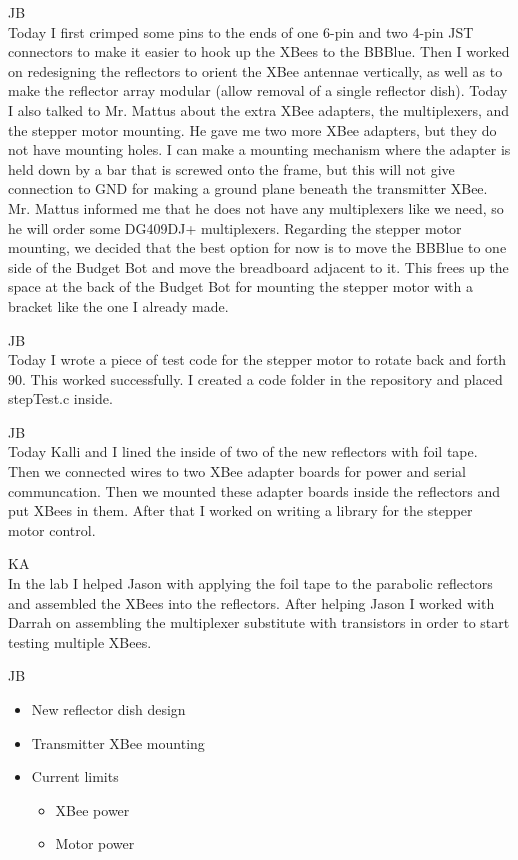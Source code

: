 \documentclass[fontsize=11pt, %
                             paper=letter, %
                             openany, %
                             captions=tableheading,
                             index=totoc,
                             hyperref]{labbook}
\begin{document}
\begin{addmargin}[0cm]{0cm}
JB\\
Today I first crimped some pins to the ends of one 6-pin and two 4-pin JST connectors to make it easier to hook up the XBees to the BBBlue. Then I worked on redesigning the reflectors to orient the XBee antennae vertically, as well as to make the reflector array modular (allow removal of a single reflector dish). Today I also talked to Mr. Mattus about the extra XBee adapters, the multiplexers, and the stepper motor mounting. He gave me two more XBee adapters, but they do not have mounting holes. I can make a mounting mechanism where the adapter is held down by a bar that is screwed onto the frame, but this will not give connection to GND for making a ground plane beneath the transmitter XBee. Mr. Mattus informed me that he does not have any multiplexers like we need, so he will order some DG409DJ+ multiplexers. Regarding the stepper motor mounting, we decided that the best option for now is to move the BBBlue to one side of the Budget Bot and move the breadboard adjacent to it. This frees up the space at the back of the Budget Bot for mounting the stepper motor with a bracket like the one I already made.



JB\\
Today I wrote a piece of test code for the stepper motor to rotate back and forth 90\textdegree. This worked successfully. I created a code folder in the repository and placed stepTest.c inside.

JB\\
Today Kalli and I lined the inside of two of the new reflectors with foil tape. Then we connected wires to two XBee adapter boards for power and serial communcation. Then we mounted these adapter boards inside the reflectors and put XBees in them. After that I worked on writing a library for the stepper motor control.

\vspace*{12pt}
KA\\
In the lab I helped Jason with applying the foil tape to the parabolic reflectors and assembled the XBees into the reflectors. After helping Jason I worked with Darrah on assembling the multiplexer substitute with transistors in order to start testing multiple XBees.

JB\\
\begin{itemize}
    \item New reflector dish design
    \item Transmitter XBee mounting
    \item Current limits
    \begin{itemize}
        \item XBee power
        \item Motor power
    \end{itemize}
\end{itemize}


\end{addmargin}
\end{document}
